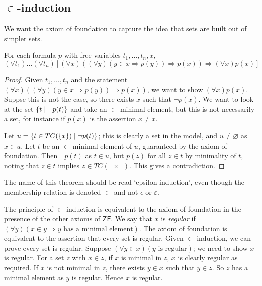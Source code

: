 \subsection{\texorpdfstring{\( \in \)}{∈}-induction}
We want the axiom of foundation to capture the idea that sets are built out of simpler sets.
\begin{theorem}
    For each formula \( p \) with free variables \( t_1, \dots, t_n, x \),
    \[ (\forall t_1)\dots(\forall t_n)[(\forall x)((\forall y)(y \in x \Rightarrow p(y)) \Rightarrow p(x)) \Rightarrow (\forall x)p(x)] \]
\end{theorem}
\begin{proof}
    Given \( t_1, \dots, t_n \) and the statement \( (\forall x)((\forall y)(y \in x \Rightarrow p(y)) \Rightarrow p(x)) \), we want to show \( (\forall x)p(x) \).
    Suppse this is not the case, so there exists \( x \) such that \( \neg p(x) \).
    We want to look at the set \( \qty{t \mid \neg p(t)} \) and take an \( \in \)-minimal element, but this is not necessarily a set, for instance if \( p(x) \) is the assertion \( x \neq x \).

    Let \( u = \qty{t \in TC(\qty{x}) \mid \neg p(t)} \); this is clearly a set in the model, and \( u \neq \varnothing \) as \( x \in u \).
    Let \( t \) be an \( \in \)-minimal element of \( u \), guaranteed by the axiom of foundation.
    Then \( \neg p(t) \) as \( t \in u \), but \( p(z) \) for all \( z \in t \) by minimality of \( t \), noting that \( z \in t \) implies \( z \in TC(\qty{x}) \).
    This gives a contradiction.
\end{proof}
The name of this theorem should be read `epsilon-induction', even though the membership relation is denoted \( \in \) and not \( \epsilon \) or \( \varepsilon \).

The principle of \( \in \)-induction is equivalent to the axiom of foundation in the presence of the other axioms of \( \mathsf{ZF} \).
We say that \( x \) is \emph{regular} if \( (\forall y)(x \in y \Rightarrow y \text{ has a minimal element}) \).
The axiom of foundation is equivalent to the assertion that every set is regular.
Given \( \in \)-induction, we can prove every set is regular.
Suppose \( (\forall y \in x)(y \text{ is regular}) \); we need to show \( x \) is regular.
For a set \( z \) with \( x \in z \), if \( x \) is minimal in \( z \), \( x \) is clearly regular as required.
If \( x \) is not minimal in \( z \), there exists \( y \in x \) such that \( y \in z \).
So \( z \) has a minimal element as \( y \) is regular.
Hence \( x \) is regular.

